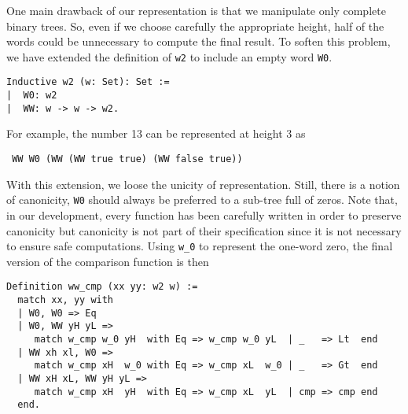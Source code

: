 One main drawback of our representation is that we manipulate only complete 
binary trees. 
So, even if we choose carefully the appropriate height, half of the words 
could be unnecessary to compute the final result. 
To soften this problem, we have extended the definition of {\tt w2} 
to include an empty word {\tt W0}. 
\begin{verbatim}
Inductive w2 (w: Set): Set :=  
|  W0: w2
|  WW: w -> w -> w2.
\end{verbatim}
For example, the number 13 can be represented at height 3 as
\begin{verbatim}
 WW W0 (WW (WW true true) (WW false true))
\end{verbatim}
With this extension, we loose the unicity of representation. Still, there is a notion
of canonicity, {\tt W0} should always be preferred to a sub-tree full of zeros. Note that, in
our development, every function has been carefully written in order to preserve canonicity but
canonicity  is not part of their specification since it is not necessary to ensure safe computations.
Using {\tt w\_0} to represent the one-word zero, 
the final version of the comparison function is then
\begin{verbatim}
Definition ww_cmp (xx yy: w2 w) :=
  match xx, yy with
  | W0, W0 => Eq
  | W0, WW yH yL =>
     match w_cmp w_0 yH  with Eq => w_cmp w_0 yL  | _   => Lt  end
  | WW xh xl, W0 =>
     match w_cmp xH  w_0 with Eq => w_cmp xL  w_0 | _   => Gt  end
  | WW xH xL, WW yH yL =>
     match w_cmp xH  yH  with Eq => w_cmp xL  yL  | cmp => cmp end
  end.
\end{verbatim}


